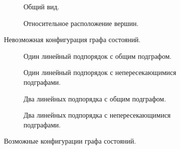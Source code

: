\begin{figure}[ht]
  \centering
  \begin{subfigure}{0.45\textwidth}
    \centering
    
    \caption{Общий вид.}
    \label{fig:impossible_config}
  \end{subfigure}
  \hfill
  \begin{subfigure}{0.45\textwidth}
    \centering
    
    \caption{Относительное расположение вершин.}
    \label{fig:impossible_config_closer_look}
  \end{subfigure}
  \caption{Невозможная конфигурация графа состояний.}
  \label{fig:all_impossible}
\end{figure}

\begin{figure}[htbp]
  \centering
  \begin{subfigure}{0.45\textwidth}
    \centering
    
    \caption{Один линейный подпорядок с общим подграфом.}
    \label{fig:one_linext_intersect}
  \end{subfigure}
  \hfill
  \begin{subfigure}{0.45\textwidth}
    \centering
    
    \caption{Один линейный подпорядок с непересекающимися подграфами.}
    \label{fig:one_linext_notintersect}
  \end{subfigure}

  \vspace{5mm}

  \begin{subfigure}{0.45\textwidth}
    \centering
    
    \caption{Два линейных подпорядка с общим подграфом.}
    \label{fig:two_linext_intersect}
  \end{subfigure}
  \hfill
  \begin{subfigure}{0.45\textwidth}
    \centering
    
    \caption{Два линейных подпорядка с непересекающимися подграфами.}
    \label{fig:two_linext_notintersect}
  \end{subfigure}

  \caption{Возможные конфигурации графа состояний.}
  \label{fig:all_sg_conf}
\end{figure}

